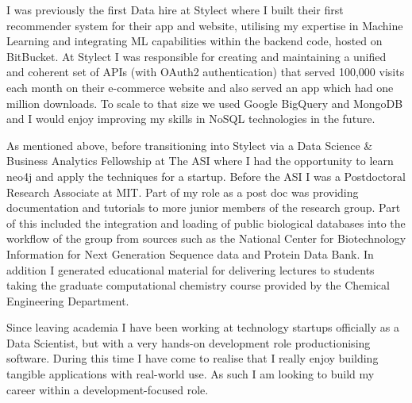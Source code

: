 \documentclass[11pt,a4paper,sans]{moderncv}        %
\begin{document}
I was previously the first Data hire at Stylect where I built their first recommender system for their app and website, utilising my expertise in Machine Learning and integrating ML capabilities within the backend code, hosted on BitBucket. At Stylect I was responsible for creating and maintaining a unified and coherent set of APIs (with OAuth2 authentication) that served 100,000 visits each month on their e-commerce website and also served an app which had one million downloads. To scale to that size we used Google BigQuery and MongoDB and I would enjoy improving my skills in NoSQL technologies in the future.

As mentioned above, before transitioning into Stylect via a Data Science \& Business Analytics Fellowship at The ASI where I had the opportunity to learn neo4j and apply the techniques for a startup. Before the ASI I was a Postdoctoral Research Associate at MIT. Part of my role as a post doc was providing documentation and tutorials to more junior members of the research group.
Part of this included the integration and loading of public biological databases 
into the workflow of the group from sources such as the National Center for Biotechnology Information for Next Generation Sequence data and Protein Data Bank. In addition I generated educational material for delivering lectures to students taking the graduate computational chemistry course provided by the Chemical Engineering Department.  

Since leaving academia I have been working at technology startups officially as a Data Scientist, but with a very hands-on development role productionising software. During this time I have come to realise that I really enjoy building tangible applications with real-world use. As such I am looking to build my career within a development-focused role.

~\\
~\\

\makeletterclosing

%

%
\renewcommand{\refname}{Links}

\end{document}
